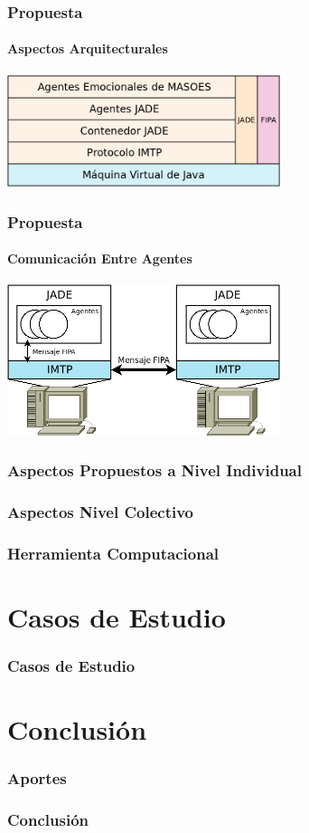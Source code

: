\documentclass{beamer}
\begin{document}
\begin{frame}
\frametitle{Propuesta}
\framesubtitle{Aspectos Arquitecturales}
\includegraphics[width=8cm]{ilustraciones/arquitectura}
\end{frame}

\begin{frame}
\frametitle{Propuesta}
\framesubtitle{Comunicación Entre Agentes}
\includegraphics[width=8cm]{ilustraciones/comunicacion-entre-hosts}
\end{frame}

\begin{frame}
\frametitle{Aspectos Propuestos a Nivel Individual}

\end{frame}

\begin{frame}
\frametitle{Aspectos Nivel Colectivo}

\end{frame}

\begin{frame}
\frametitle{Herramienta Computacional}

\end{frame}

\section{Casos de Estudio}
\begin{frame}
\frametitle{Casos de Estudio}

\end{frame}


\section{Conclusión}
\begin{frame}
\frametitle{Aportes}

\end{frame}

\begin{frame}
\frametitle{Conclusión}

\end{frame}


\ThankYouFrame
\end{document}
